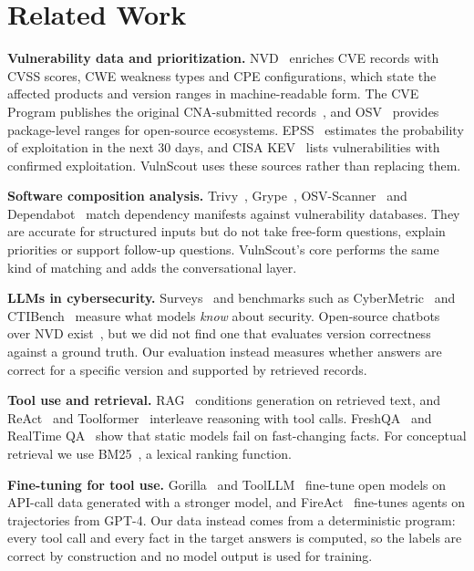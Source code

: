 \documentclass[final]{cvpr}
\begin{document}
\section{Related Work}
\label{sec:related}

\textbf{Vulnerability data and prioritization.} NVD~\cite{nvd} enriches CVE records with CVSS scores, CWE weakness types and CPE configurations, which state the affected products and version ranges in machine-readable form. The CVE Program publishes the original CNA-submitted records~\cite{cvelistv5}, and OSV~\cite{osv} provides package-level ranges for open-source ecosystems. EPSS~\cite{jacobs2019epss,jacobs2023epss} estimates the probability of exploitation in the next 30 days, and CISA KEV~\cite{cisakev} lists vulnerabilities with confirmed exploitation. VulnScout uses these sources rather than replacing them.

\textbf{Software composition analysis.} Trivy~\cite{trivy}, Grype~\cite{grype}, OSV-Scanner~\cite{osvscanner} and Dependabot~\cite{dependabot} match dependency manifests against vulnerability databases. They are accurate for structured inputs but do not take free-form questions, explain priorities or support follow-up questions. VulnScout's core performs the same kind of matching and adds the conversational layer.

\textbf{LLMs in cybersecurity.} Surveys~\cite{xu2024llmsecurity} and benchmarks such as CyberMetric~\cite{tihanyi2024cybermetric} and CTIBench~\cite{alam2024ctibench} measure what models \emph{know} about security. Open-source chatbots over NVD exist~\cite{nvdchatbot,cvellmdataset}, but we did not find one that evaluates version correctness against a ground truth. Our evaluation instead measures whether answers are correct for a specific version and supported by retrieved records.

\textbf{Tool use and retrieval.} RAG~\cite{lewis2020rag} conditions generation on retrieved text, and ReAct~\cite{yao2023react} and Toolformer~\cite{schick2023toolformer} interleave reasoning with tool calls. FreshQA~\cite{vu2023freshllms} and RealTime QA~\cite{kasai2022realtimeqa} show that static models fail on fast-changing facts. For conceptual retrieval we use BM25~\cite{robertson2009bm25}, a lexical ranking function.

\textbf{Fine-tuning for tool use.} Gorilla~\cite{patil2023gorilla} and ToolLLM~\cite{qin2024toolllm} fine-tune open models on API-call data generated with a stronger model, and FireAct~\cite{chen2023fireact} fine-tunes agents on trajectories from GPT-4. Our data instead comes from a deterministic program: every tool call and every fact in the target answers is computed, so the labels are correct by construction and no model output is used for training.
\end{document}
